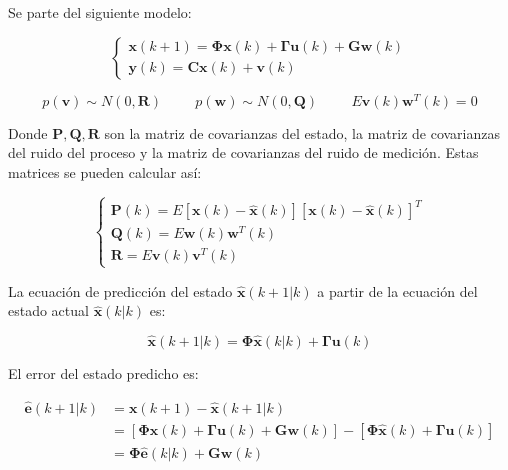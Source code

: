 \documentclass[10pt]{article}
\begin{document}
	\noindent Se parte del siguiente modelo:
	
		\begin{equation*}
			\begin{cases}
				\mathbf{x}(k+1) = \mathbf{\Phi x}(k) + \mathbf{\Gamma u}(k) + \mathbf{G w}(k)\\
				\mathbf{y}(k) = \mathbf{C x}(k) + \mathbf{v}(k)
			\end{cases}
		\end{equation*}
	
		\begin{equation*}
			p(\mathbf{v}) \sim N(0,\mathbf{R}) \hspace{1cm} p(\mathbf{w}) \sim 	N(0,\mathbf{Q}) \hspace{1cm} E\mathbf{v}(k)\mathbf{w}^{T}(k) = 0
		\end{equation*}
	
	\noindent Donde $\mathbf{P, Q, R}$ son la matriz de covarianzas del estado, la matriz de covarianzas del ruido del proceso y la matriz de covarianzas del ruido de medición. Estas matrices se pueden calcular así:
	
		\begin{equation*}
			\begin{cases}
				\mathbf{P}(k) = E[\mathbf{x}(k) - \hat{\mathbf{x}}(k)][\mathbf{x}(k) - \hat{\mathbf{x}}(k)]^{T}\\
				\mathbf{Q}(k) = E\mathbf{w}(k)\mathbf{w}^{T}(k) \\
				\mathbf{R} = E\mathbf{v}(k)\mathbf{v}^{T}(k)
			\end{cases}
		\end{equation*}	
	
	\noindent La ecuación de predicción del estado $\hat{\mathbf{x}}(k+1|k)$ a partir de la ecuación del estado actual $\hat{\mathbf{x}}(k|k)$ es:
	
		\begin{equation*}
			\hat{\mathbf{x}}(k+1|k) = \mathbf{\Phi\hat{x}}(k|k) + \mathbf{\Gamma u}(k)
		\end{equation*}
	
	\noindent El error del estado predicho es:
	
		\begin{align*}
			\hat{\mathbf{e}}(k+1|k) 	&=	\mathbf{x}(k+1) - \hat{\mathbf{x}}(k+1|k)\\
										&=	[\mathbf{\Phi x}(k) + \mathbf{\Gamma u}(k) + \mathbf{G w}(k)] - [\mathbf{\Phi}\hat{\mathbf{x}}(k) + \mathbf{\Gamma u}(k)] \\
										&=	\mathbf{\Phi\hat{e}}(k|k) + \mathbf{G w}(k)
		\end{align*}
\end{document}
